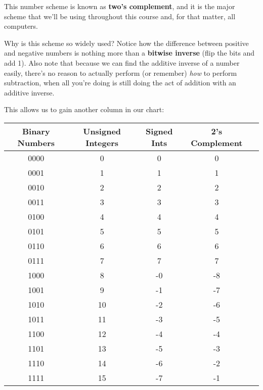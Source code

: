 \documentclass[12pt]{article}
\begin{document}
    This number scheme is known as \textbf{two's complement}, and it is the major scheme
    that we'll be using throughout this course and, for that matter, all computers.

    Why is this scheme so widely used? %
    Notice how the difference between positive and negative
    numbers is nothing more than a \textbf{bitwise inverse} (flip the bits and add 1). Also note that because we can find
    the additive inverse of a number easily, there's no reason to actually perform (or remember)
    \textit{how} to perform subtraction, when all you're doing is still doing the act of addition
    with an additive inverse.

    This allows us to gain another column in our chart:

    \begin{center}
        \begin{tabular}{|c|c|c|c|c|}
          \hline
          Binary Numbers & Unsigned Integers & Signed Ints & 2's Complement \\
          \hline
          0000 & 0 & 0 & 0 \\ 
          0001 & 1 & 1 & 1\\  
          0010 & 2 & 2 & 2\\  
          0011 & 3 & 3 & 3\\  
          0100 & 4 & 4 & 4\\  
          0101 & 5 & 5 & 5\\  
          0110 & 6 & 6 & 6\\         
          0111 & 7 & 7 & 7\\  
          1000 & 8 & -0 & -8 \\  
          1001 & 9 & -1 & -7 \\  
          1010 & 10 & -2 & -6 \\
          1011 & 11 & -3 & -5 \\
          1100 & 12 & -4 & -4 \\
          1101 & 13 & -5 & -3 \\
          1110 & 14 & -6 & -2 \\
          1111 & 15 & -7 & -1 \\
          \hline
        \end{tabular}
    \end{center}
\end{document}

